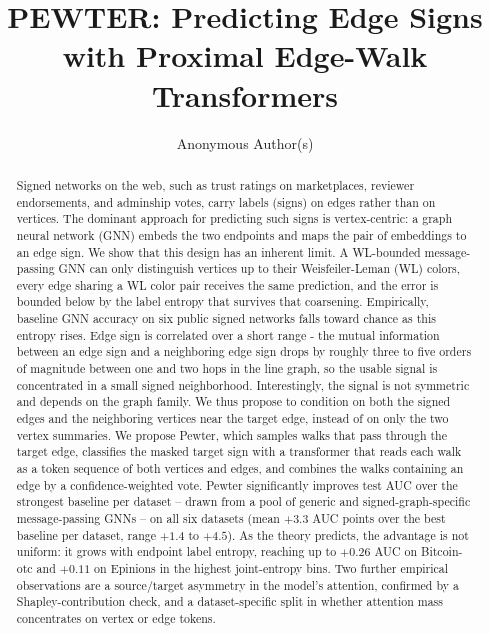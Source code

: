 \documentclass[sigconf, review, anonymous]{acmart}
\theoremstyle{plain}
\theoremstyle{definition}
\begin{document}
\title{PEWTER: Predicting Edge Signs with Proximal Edge-Walk Transformers}

\author{Anonymous Author(s)}

\begin{abstract}
Signed networks on the web, such as trust ratings on marketplaces, reviewer endorsements, and adminship votes, carry labels (signs) on edges rather than on vertices. The dominant approach for predicting such signs is vertex-centric: a graph neural network (GNN) embeds the two endpoints and maps the pair of embeddings to an edge sign. We show that this design has an inherent limit. A WL-bounded message-passing GNN can only distinguish vertices up to their Weisfeiler-Leman (WL) colors, every edge sharing a WL color pair receives the same prediction, and the error is bounded below by the label entropy that survives that coarsening.  Empirically, baseline GNN accuracy on six public signed networks falls toward chance as this entropy rises. Edge sign is correlated over a short range - the mutual information between an edge sign and a neighboring edge sign drops by roughly three to five orders of magnitude between one and two hops in the line graph, so the usable signal is concentrated in a small signed neighborhood. Interestingly, the signal is not symmetric and depends on the graph family. We thus propose to condition on both the signed edges and the neighboring vertices near the target edge, instead of on only the two vertex summaries. We propose Pewter, which samples walks that pass through the target edge, classifies the masked target sign with a transformer that reads each walk as a token sequence of both vertices and edges, and combines the walks containing an edge by a confidence-weighted vote. Pewter significantly improves test AUC over the strongest baseline per dataset -- drawn from a pool of generic and signed-graph-specific message-passing GNNs -- on all six datasets (mean $+3.3$ AUC points over the best baseline per dataset, range $+1.4$ to $+4.5$). As the theory predicts, the advantage is not uniform: it grows with endpoint label entropy, reaching up to $+0.26$ AUC on Bitcoin-otc and $+0.11$ on Epinions in the highest joint-entropy bins. Two further empirical observations are a source/target asymmetry in the model's attention, confirmed by a Shapley-contribution check, and a dataset-specific split in whether attention mass concentrates on vertex or edge tokens.
\end{abstract}
\end{document}
